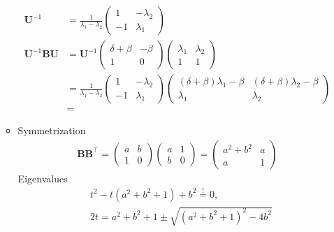 \documentclass{article}
\newcommand{\mB}{{\mathbf B}}
\newcommand{\mU}{{\mathbf U}}
\begin{document}
\begin{enumerate}
\begin{itemize}
\newpage
\begin{align}
\mU^{-1} & = \frac{1}{\lambda_1-\lambda_2} \begin{pmatrix} 1 & -\lambda_2 \\ -1 & \lambda_1\end{pmatrix}\\
 \mU^{-1} \mB \mU 
& = \mU^{-1}  \begin{pmatrix} \delta+\beta  & -\beta \\ 1 & 0 \end{pmatrix} \begin{pmatrix} \lambda_1 & \lambda_2 \\ 1 & 1 \end{pmatrix} \\
& = \frac{1}{\lambda_1-\lambda_2} \begin{pmatrix} 1 & -\lambda_2 \\ -1 & \lambda_1\end{pmatrix} \begin{pmatrix} (\delta+\beta)\lambda_1 - \beta  & (\delta+\beta)\lambda_2-\beta \\ \lambda_1 & \lambda_2 \end{pmatrix} \\
& =
\end{align}
\item Symmetrization
\begin{align}
\mB \mB^\top 
= \begin{pmatrix} a  & b \\ 1 & 0 \end{pmatrix} \begin{pmatrix} a  & 1 \\ b & 0 \end{pmatrix} 
= \begin{pmatrix} a^2 + b^2 & a \\ a & 1\end{pmatrix}
\end{align}
Eigenvalues 
\begin{align}
& t^2  - t (a^2 + b^2 + 1) + b^2 \stackrel !=0, \;
\\
& 2 t = a^2+b^2+1 \pm \sqrt{(a^2+b^2+1)^2- 4b^2}
\end{align}
\newpage


\end{itemize}
\end{enumerate}
\end{document}
